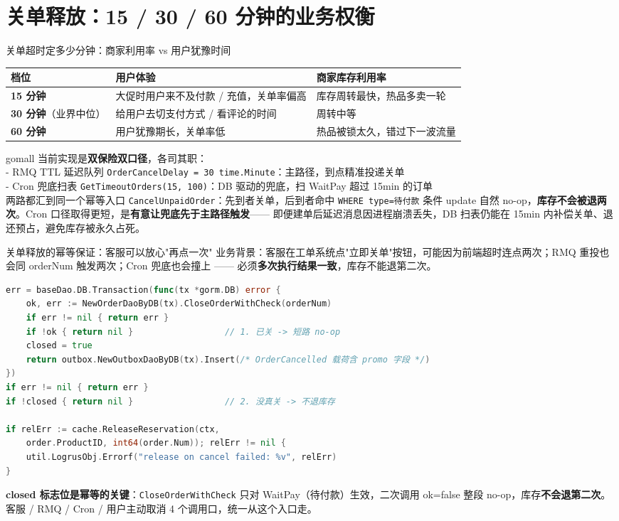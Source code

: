 \documentclass[aspectratio=169,11pt]{beamer}
\begin{document}
\section{关单释放：15 / 30 / 60 分钟的业务权衡}

\begin{frame}[shrink]{关单超时定多少分钟：商家利用率 vs 用户犹豫时间}
\begin{tabular}{@{}lp{4cm}p{4cm}@{}}
\toprule
档位 & 用户体验 & 商家库存利用率 \\
\midrule
\textbf{15 分钟} & 大促时用户来不及付款 / 充值，关单率偏高 & 库存周转最快，热品多卖一轮 \\
\textbf{30 分钟}（业界中位） & 给用户去切支付方式 / 看评论的时间 & 周转中等 \\
\textbf{60 分钟}            & 用户犹豫期长，关单率低                & 热品被锁太久，错过下一波流量 \\
\bottomrule
\end{tabular}
\vspace{2mm}
\small gomall 当前实现是\textbf{双保险双口径}，各司其职：\\
\quad - RMQ TTL 延迟队列 \texttt{OrderCancelDelay = 30 \* time.Minute}：主路径，到点精准投递关单 \\
\quad - Cron 兜底扫表 \texttt{GetTimeoutOrders(15, 100)}：DB 驱动的兜底，扫 WaitPay 超过 15min 的订单 \\
两路都汇到同一个幂等入口 \texttt{CancelUnpaidOrder}：先到者关单，后到者命中 \texttt{WHERE type=待付款} 条件 update 自然 no-op，\textbf{库存不会被退两次}。Cron 口径取得更短，是\textbf{有意让兜底先于主路径触发}—— 即便建单后延迟消息因进程崩溃丢失，DB 扫表仍能在 15min 内补偿关单、退还预占，避免库存被永久占死。
\end{frame}

\begin{frame}{关单释放的幂等保证：客服可以放心"再点一次"}
\small 业务背景：客服在工单系统点"立即关单"按钮，可能因为前端超时连点两次；RMQ 重投也会同 orderNum 触发两次；Cron 兜底也会撞上 —— 必须\textbf{多次执行结果一致}，库存不能退第二次。
\begin{lstlisting}[language=Go,firstnumber=31,
  caption={}]
err = baseDao.DB.Transaction(func(tx *gorm.DB) error {
    ok, err := NewOrderDaoByDB(tx).CloseOrderWithCheck(orderNum)
    if err != nil { return err }
    if !ok { return nil }                  // 1. 已关 -> 短路 no-op
    closed = true
    return outbox.NewOutboxDaoByDB(tx).Insert(/* OrderCancelled 载荷含 promo 字段 */)
})
if err != nil { return err }
if !closed { return nil }                  // 2. 没真关 -> 不退库存

if relErr := cache.ReleaseReservation(ctx,
    order.ProductID, int64(order.Num)); relErr != nil {
    util.LogrusObj.Errorf("release on cancel failed: %v", relErr)
}
\end{lstlisting}
\small \textbf{closed 标志位是幂等的关键}：\texttt{CloseOrderWithCheck} 只对 WaitPay（待付款）生效，二次调用 ok=false 整段 no-op，库存\textbf{不会退第二次}。客服 / RMQ / Cron / 用户主动取消 4 个调用口，统一从这个入口走。
\end{frame}
\end{document}
